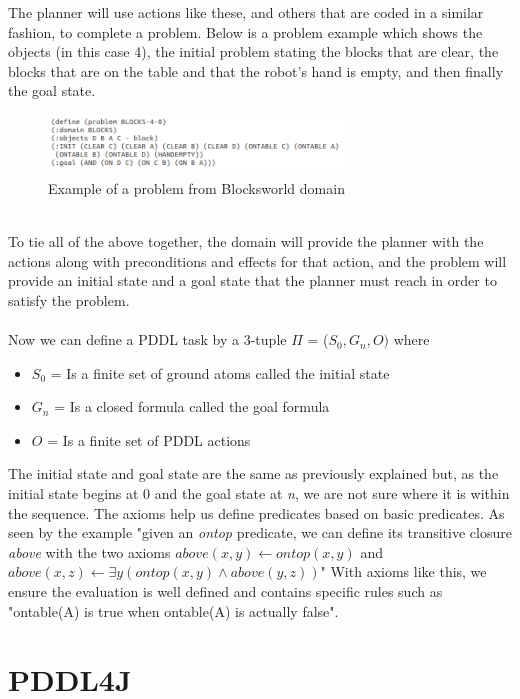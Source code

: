 The planner will use actions like these, and others that are coded in a similar fashion, to complete a problem. Below is a problem example which shows the objects (in this case 4), the initial problem stating the blocks that are clear, the blocks that are on the table and that the robot's hand is empty, and then finally the goal state. 
\begin{figure}[!htb]
    \centering
    \includegraphics[scale=2.0,width=0.70\textwidth]{BlocksworldProblem.png}
    \caption{Example of a problem from Blocksworld 
    domain}
    \label{fig:Blocksworld Problem}
\end{figure}
\\
To tie all of the above together, the domain will provide the planner with the actions along with preconditions and effects for that action, and the problem will provide an initial state and a goal state that the planner must reach in order to satisfy the problem. 
\\
\\
Now we can define a PDDL task by a 3-tuple $\Pi$ = ($S_0, G_n, O)$ where
\begin{itemize}
\item $S_0$ = Is a finite set of ground atoms called the initial state
\item $G_n$ = Is a closed formula called the goal formula
\item $O$ = Is a finite set of PDDL actions \cite{ConciseDomain}
\end{itemize} 

The initial state and goal state are the same as previously explained but, as the initial state begins at 0 and the goal state at \textit{n}, we are not sure where it is within the sequence. The axioms help us define predicates based on basic predicates. As seen by the example "given an \textit{ontop} predicate, we can define its transitive closure \textit{above} with the two axioms \textit{$above(x,y) \leftarrow ontop(x,y)$} and \textit{$above(x,z) \leftarrow \exists y(ontop(x,y)\wedge above(y,z))$}" \cite{ConciseDomain} With axioms like this, we ensure the evaluation is well defined and contains specific rules such as "ontable(A) is true when ontable(A) is actually false".   

\section{PDDL4J}

